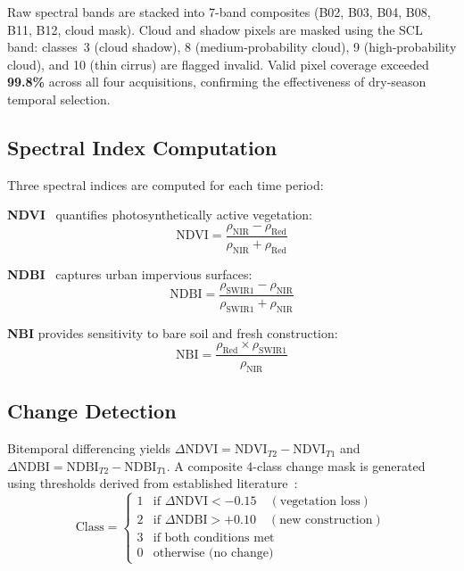 \documentclass[conference,10pt]{IEEEtran}
\begin{document}
Raw spectral bands are stacked into 7-band composites (B02, B03, B04, B08, B11, B12, cloud mask). Cloud and shadow pixels are masked using the SCL band: classes~3 (cloud shadow), 8 (medium-probability cloud), 9 (high-probability cloud), and 10 (thin cirrus) are flagged invalid. Valid pixel coverage exceeded \textbf{99.8\%} across all four acquisitions, confirming the effectiveness of dry-season temporal selection.

\subsection{Spectral Index Computation}

Three spectral indices are computed for each time period:

\noindent\textbf{NDVI}~\cite{rouse1974} quantifies photosynthetically active vegetation:
\begin{equation}
    \text{NDVI} = \frac{\rho_{\text{NIR}} - \rho_{\text{Red}}}{\rho_{\text{NIR}} + \rho_{\text{Red}}} \label{eq:ndvi}
\end{equation}

\noindent\textbf{NDBI}~\cite{zha2003} captures urban impervious surfaces:
\begin{equation}
    \text{NDBI} = \frac{\rho_{\text{SWIR1}} - \rho_{\text{NIR}}}{\rho_{\text{SWIR1}} + \rho_{\text{NIR}}} \label{eq:ndbi}
\end{equation}

\noindent\textbf{NBI} provides sensitivity to bare soil and fresh construction:
\begin{equation}
    \text{NBI} = \frac{\rho_{\text{Red}} \times \rho_{\text{SWIR1}}}{\rho_{\text{NIR}}} \label{eq:nbi}
\end{equation}

\subsection{Change Detection}

Bitemporal differencing yields $\Delta\text{NDVI} = \text{NDVI}_{T2} - \text{NDVI}_{T1}$ and $\Delta\text{NDBI} = \text{NDBI}_{T2} - \text{NDBI}_{T1}$. A composite 4-class change mask is generated using thresholds derived from established literature~\cite{zha2003}:
\begin{equation}
\text{Class} = \begin{cases}
    1 & \text{if } \Delta\text{NDVI} < -0.15 \quad (\text{vegetation loss}) \\
    2 & \text{if } \Delta\text{NDBI} > +0.10 \quad (\text{new construction}) \\
    3 & \text{if both conditions met} \\
    0 & \text{otherwise (no change)}
\end{cases}
\end{equation}
\end{document}
